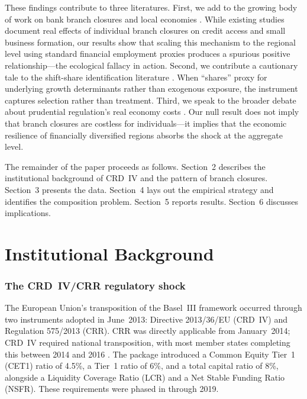 \documentclass[12pt]{article}
\begin{document}
These findings contribute to three literatures. First, we add to the growing body of work on bank branch closures and local economies \citep{nguyen2019branchclosure, cortesiglesias2020branchclosure, ho2017branchclosure, degroen2019prudreg, dagher2020regulatorycosts}. While existing studies document real effects of individual branch closures on credit access and small business formation, our results show that scaling this mechanism to the regional level using standard financial employment proxies produces a spurious positive relationship---the ecological fallacy in action. Second, we contribute a cautionary tale to the shift-share identification literature \citep{goldsmithpinkham2020shares, borusyak2022shifshare, adao2019shifshare}. When ``shares'' proxy for underlying growth determinants rather than exogenous exposure, the instrument captures selection rather than treatment. Third, we speak to the broader debate about prudential regulation's real economy costs \citep{dagher2020regulatorycosts, cecchetti2011realeffects, admati2014bankersclothes}. Our null result does not imply that branch closures are costless for individuals---it implies that the economic resilience of financially diversified regions absorbs the shock at the aggregate level.

The remainder of the paper proceeds as follows. Section~2 describes the institutional background of CRD~IV and the pattern of branch closures. Section~3 presents the data. Section~4 lays out the empirical strategy and identifies the composition problem. Section~5 reports results. Section~6 discusses implications.

\section{Institutional Background}

\subsubsection*{The CRD~IV/CRR regulatory shock} The European Union's transposition of the Basel~III framework occurred through two instruments adopted in June~2013: Directive 2013/36/EU (CRD~IV) and Regulation 575/2013 (CRR). CRR was directly applicable from January~2014; CRD~IV required national transposition, with most member states completing this between 2014 and 2016 \citep{degroen2019prudreg}. The package introduced a Common Equity Tier~1 (CET1) ratio of 4.5\%, a Tier~1 ratio of 6\%, and a total capital ratio of 8\%, alongside a Liquidity Coverage Ratio (LCR) and a Net Stable Funding Ratio (NSFR). These requirements were phased in through 2019.
\end{document}
